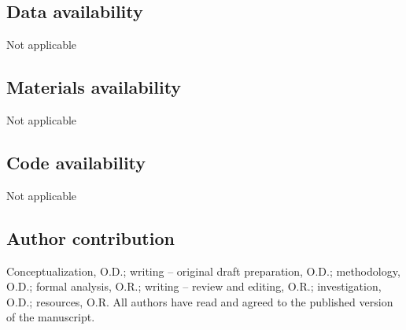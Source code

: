 \documentclass[pdflatex,sn-mathphys-num]{sn-jnl}%
\theoremstyle{thmstyleone}%
\theoremstyle{thmstyletwo}%
\theoremstyle{thmstylethree}%
\theoremstyle{thmstyletwo}%
\theoremstyle{thmstylethree}%
\begin{document}
\subsection*{Data availability} Not applicable

\subsection*{Materials availability} Not applicable

\subsection*{Code availability} Not applicable

\subsection*{Author contribution} Conceptualization, O.D.; writing -- original draft preparation, O.D.; methodology, O.D.; formal analysis, O.R.; writing -- review and editing, O.R.; investigation, O.D.; resources, O.R. All authors have read and agreed to the published version of the manuscript.



\bigskip









\end{document}
